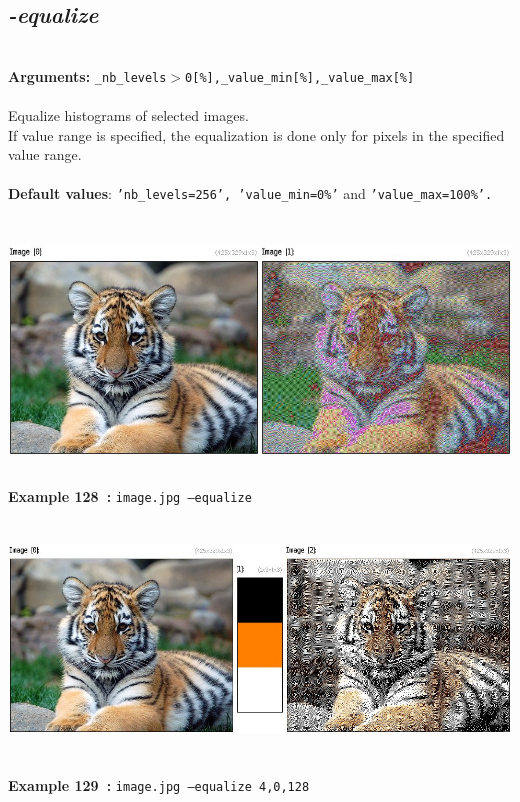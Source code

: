 \documentclass[a4paper,11pt,twoside]{book}
\begin{document}
\subsection{\emph{-equalize} }\vspace*{-0.5em}
~\\\textbf{Arguments: } 
{\small \texttt{\_nb\_levels$>$0[\%],\_value\_min[\%],\_value\_max[\%]}}\\~\\
Equalize histograms of selected images.
~\\If value range is specified, the equalization is done only for pixels in the specified
value range.
~\\~\\\textbf{Default values}: {\small \texttt{'nb\_levels=256', 'value\_min=0\%'} and \texttt{'value\_max=100\%'.}}
\begin{center}\includegraphics[keepaspectratio=true,height=7cm,width=\textwidth]{img/gmic_def128.jpg}\\
{\footnotesize \textbf{Example 128~:} \texttt{image.jpg --equalize}}
\\\includegraphics[keepaspectratio=true,height=7cm,width=\textwidth]{img/gmic_def129.jpg}\\
{\footnotesize \textbf{Example 129~:} \texttt{image.jpg --equalize 4,0,128}}
\end{center}
\end{document}
